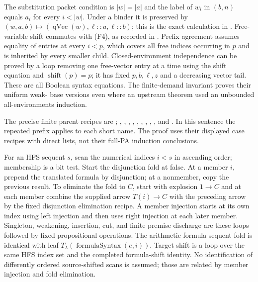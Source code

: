 The substitution packet condition is
$|w|=|a|$ and the label of $w_i$ in $(b,n)$ equals $a_i$ for every
$i<|w|$.  Under a binder it is preserved by
$(w,a,b)\mapsto(\operatorname{qVec}(w),\ell::a,\ell::b)$;
this is the exact  calculation in
.
Free-variable shift commutes with (F4), as recorded in
.
Prefix agreement assumes equality of entries at every $i<p$,
which covers all free indices occurring in $p$ and is inherited by
every smaller child.  Closed-environment independence can be proved
by a loop removing one free-vector entry at a time using the shift
equation and $\operatorname{shift}(p)=p$; it has fixed $p,b,\ell,z$
and a decreasing vector tail.  These are all Boolean syntax
equations.  The finite-demand invariant proves their uniform weak-
base versions even where an upstream theorem used an unbounded
all-environments induction.

The precise finite parent recipes are
;
,
, , ,
, , ,
, , and
.  In this sentence the repeated prefix
 applies to each short name.
The proof uses their displayed case recipes with direct lists,
not their full-PA induction conclusions.

For an HFS sequent $s$, scan the numerical indices $i<s$ in ascending
order; membership is a bit test.  Start the disjunction fold at false.
At a member $i$, prepend the translated formula by disjunction;
at a nonmember, copy the previous result.  To eliminate the fold to
$C$, start with explosion $1\to C$ and at each member combine the
supplied arrow $T(i)\to C$ with the preceding arrow by the fixed
disjunction elimination recipe.  A member injection starts at its
own index using left injection and then uses right injection at each
later member.  Singleton, weakening, insertion, cut, and finite
premise discharge are these loops followed by fixed propositional
operations.  The arithmetic-formula sequent fold is identical with
leaf $T_\lambda(\operatorname{formulaSyntax}(e,i))$.
Target shift is a loop over the same HFS index set and the completed
formula-shift identity.  No identification of differently ordered
source-shifted scans is assumed; those are related by member
injection and fold elimination.

